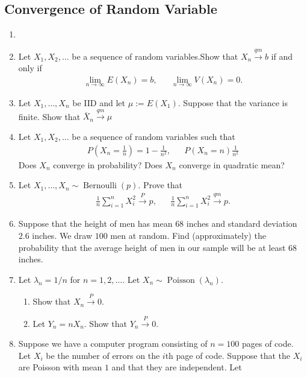 \documentclass{article}
\begin{document}
\subsection{Convergence of Random Variable}
\begin{enumerate}
	\item
	\item Let $X_1, X_2, \dots$ be a sequence of random variables.Show that $X_n \overset{qm}{\longrightarrow} b$ if and only if
	$$
	\begin{aligned}
	\lim_{n \rightarrow \infty} E(X_n) = b,&&\lim_{n \rightarrow \infty}V(X_n) = 0.
	\end{aligned}
	$$
	\item Let $X_1, \dots, X_n$ be IID and let $\mu := E(X_1)$. Suppose that the variance is finite. Show that $\overline{X}_n \overset{qm}{\longrightarrow} \mu$
	\item Let $X_1, X_2, \dots$ be a sequence of random variables such that
	$$
	\begin{aligned}
	P\left(X_n = \frac{1}{n}\right) = 1 - \frac{1}{n^2},&& P(X_n = n) \frac{1}{n^2}
	\end{aligned}
	$$
	Does $X_n$ converge in probability? Does $X_n$ converge in quadratic mean?
	\item Let $X_1, \dots, X_n \sim \operatorname{Bernoulli}(p)$. Prove that
	$$
	\begin{aligned}
	\frac{1}{n} \sum_{i = 1}^n X_i^2 \overset{P}{\longrightarrow} p,&& \frac{1}{n}\sum_{i = 1}^n X_i^2 \overset{qm}{\longrightarrow} p.
	\end{aligned}
	$$
	\item Suppose that the height of men has mean $68$ inches and standard deviation $2.6$ inches. We draw $100$ men at random. Find (approximately) the probability that the average height of men in our sample will be at least $68$ inches.
	\item Let $\lambda_n = 1 / n$ for $n = 1, 2, \dots$. Let $X_n \sim \operatorname{Poisson}(\lambda_n)$.
		\begin{enumerate}
			\item Show that $X_n \overset{P}{\longrightarrow} 0$.
			\item Let $Y_n = nX_n$. Show that $Y_n \overset{P}{\longrightarrow} 0$.
		\end{enumerate}
	\item Suppose we have a computer program consisting of $n = 100$ pages of code. Let $X_i$ be the number of errors on the $i$th page of code. Suppose that the $X_i$ are Poisson with mean $1$ and that they are independent. Let

\end{enumerate}
\end{document}
